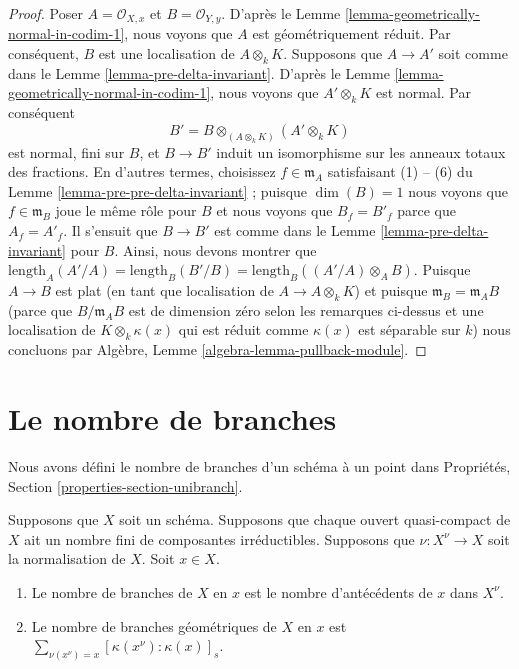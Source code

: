 \begin{proof}
Poser $A = \mathcal{O}_{X, x}$ et $B = \mathcal{O}_{Y,
y}$. D'après le Lemme
\ref{lemma-geometrically-normal-in-codim-1}, nous voyons
que $A$ est géométriquement réduit. Par conséquent, $B$ est
une localisation de $A \otimes_k K$. Supposons que $A \to
A'$ soit comme dans le Lemme \ref{lemma-pre-delta-invariant}.
D'après le Lemme \ref{lemma-geometrically-normal-in-codim-1},
nous voyons que $A' \otimes_k K$ est normal. Par conséquent
$$
B' = B \otimes_{(A \otimes_k K)} (A' \otimes_k K)
$$
est normal, fini sur $B$, et $B \to B'$ induit un isomorphisme
sur les anneaux totaux des fractions. En d'autres termes,
choisissez $f \in \mathfrak m_A$ satisfaisant (1) -- (6) du
Lemme \ref{lemma-pre-pre-delta-invariant} ; puisque $\dim(B) =
1$ nous voyons que $f \in \mathfrak m_B$ joue le même rôle pour
$B$ et nous voyons que $B_f = B'_f$ parce que $A_f = A'_f$. Il
s'ensuit que $B \to B'$ est comme dans le Lemme
\ref{lemma-pre-delta-invariant} pour $B$. Ainsi, nous devons
montrer que $\text{length}_A(A'/A) = \text{length}_B(B'/B) =
\text{length}_B((A'/A) \otimes_A B)$. Puisque $A \to B$ est plat (en
tant que localisation de $A \to A \otimes_k K$) et puisque $\mathfrak
m_B = \mathfrak m_A B$ (parce que $B/\mathfrak m_A B$ est de dimension
zéro selon les remarques ci-dessus et une localisation de $K
\otimes_k \kappa(x)$ qui est réduit comme $\kappa(x)$ est séparable sur
$k$) nous concluons par Algèbre, Lemme \ref{algebra-lemma-pullback-module}.
\end{proof}





\section{Le nombre de branches}
\label{section-number-of-branches}

\noindent
Nous avons défini le nombre de branches d’un schéma à un point
dans Propriétés, Section \ref{properties-section-unibranch}.

\begin{lemma}
\label{lemma-number-of-branches}
Supposons que $X$ soit un schéma. Supposons que chaque ouvert
quasi-compact de $X$ ait un nombre fini de composantes irréductibles.
Supposons que $\nu : X^\nu \to X$ soit la normalisation de $X$. Soit $x \in X$.
\begin{enumerate}
\item Le nombre de branches de $X$ en $x$ est le
nombre d'antécédents de $x$ dans $X^\nu$. \item Le
nombre de branches géométriques de $X$ en $x$ est
$\sum_{\nu(x^\nu) = x} [\kappa(x^\nu) : \kappa(x)]_s$.
\end{enumerate}
\end{lemma}

